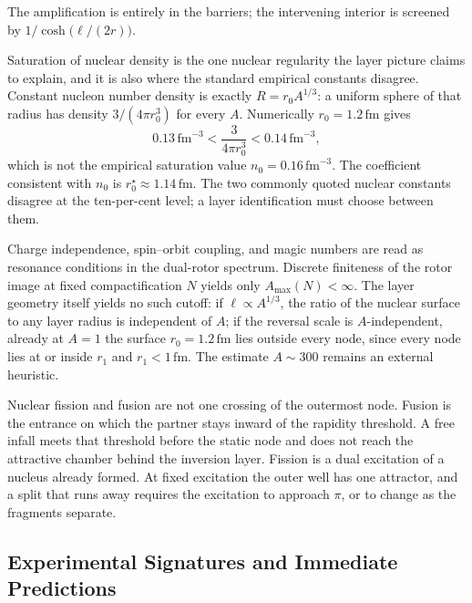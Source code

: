 \documentclass[a4paper]{article}
\begin{document}
The amplification is entirely in the barriers; the intervening interior is screened by \(1/\cosh\bigl(\ell/(2r)\bigr)\).

Saturation of nuclear density is the one nuclear regularity the layer picture claims to explain, and it is also where the standard empirical constants disagree. Constant nucleon number density is exactly \(R=r_0A^{1/3}\): a uniform sphere of that radius has density \(3/(4\pi r_0^3)\) for every \(A\). Numerically \(r_0=1.2\,\mathrm{fm}\) gives
\[
0.13\,\mathrm{fm}^{-3}<\frac{3}{4\pi r_0^3}<0.14\,\mathrm{fm}^{-3},
\]
which is not the empirical saturation value \(n_0=0.16\,\mathrm{fm}^{-3}\). The coefficient consistent with \(n_0\) is \(r_0^\star\approx 1.14\,\mathrm{fm}\). The two commonly quoted nuclear constants disagree at the ten-per-cent level; a layer identification must choose between them.

Charge independence, spin--orbit coupling, and magic numbers are read as resonance conditions in the dual-rotor spectrum. Discrete finiteness of the rotor image at fixed compactification \(N\) yields only \(A_{\max}(N)<\infty\). The layer geometry itself yields no such cutoff: if \(\ell\propto A^{1/3}\), the ratio of the nuclear surface to any layer radius is independent of \(A\); if the reversal scale is \(A\)-independent, already at \(A=1\) the surface \(r_0=1.2\,\mathrm{fm}\) lies outside every node, since every node lies at or inside \(r_1\) and \(r_1<1\,\mathrm{fm}\). The estimate \(A\sim 300\) remains an external heuristic.

Nuclear fission and fusion are not one crossing of the outermost node. Fusion is the entrance on which the partner stays inward of the rapidity threshold. A free infall meets that threshold before the static node and does not reach the attractive chamber behind the inversion layer. Fission is a dual excitation of a nucleus already formed. At fixed excitation the outer well has one attractor, and a split that runs away requires the excitation to approach \(\pi\), or to change as the fragments separate.

\subsection{Experimental Signatures and Immediate Predictions}
\end{document}
